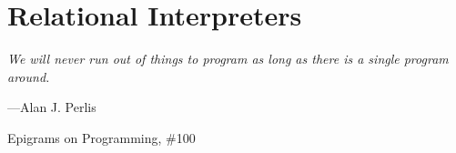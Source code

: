 \chapter{Relational Interpreters}

\vspace{-1.5cm}
\begin{fullwidth}
\begin{flushright}
\Large
\textit{We will never run out of things to program as long as there is a single program around.}

\wspace

---Alan J. Perlis

\noindent
Epigrams on Programming, \#100\nocite{Perlis:1982:SFE:947955.1083808}
\normalsize
\end{flushright}
\end{fullwidth}
